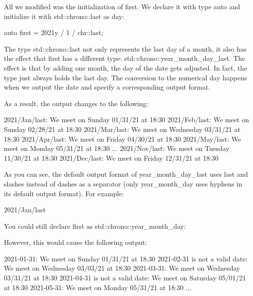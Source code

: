 All we modified was the initialization of first. We declare it with type auto and initialize it with std::chrono::last as day:

\begin{cpp}
auto first = 2021y / 1 / chr::last;
\end{cpp}

The type std::chrono::last not only represents the last day of a month, it also has the effect that first has a different type: std::chrono::year\_month\_day\_last. The effect is that by adding one month, the day of the date gets adjusted. In fact, the type just always holds the last day. The conversion to the numerical day happens when we output the date and specify a corresponding output format.

As a result, the output changes to the following:

\begin{shell}
2021/Jan/last:
 We meet on Sunday 01/31/21 at 18:30
2021/Feb/last:
 We meet on Sunday 02/28/21 at 18:30
2021/Mar/last:
 We meet on Wednesday 03/31/21 at 18:30
2021/Apr/last:
 We meet on Friday 04/30/21 at 18:30
2021/May/last:
 We meet on Monday 05/31/21 at 18:30
...
2021/Nov/last:
 We meet on Tuesday 11/30/21 at 18:30
2021/Dec/last:
 We meet on Friday 12/31/21 at 18:30
\end{shell}

As you can see, the default output format of year\_month\_day\_last uses last and slashes instead of dashes as a separator (only year\_month\_day uses hyphens in its default output format). For example:

\begin{shell}
2021/Jan/last
\end{shell}

You could still declare first as std::chrono::year\_month\_day:


However, this would cause the following output:

\begin{shell}
2021-01-31:
 We meet on Sunday 01/31/21 at 18:30
2021-02-31 is not a valid date:
 We meet on Wednesday 03/03/21 at 18:30
2021-03-31:
 We meet on Wednesday 03/31/21 at 18:30
2021-04-31 is not a valid date:
 We meet on Saturday 05/01/21 at 18:30
2021-05-31:
 We meet on Monday 05/31/21 at 18:30
...
\end{shell}

